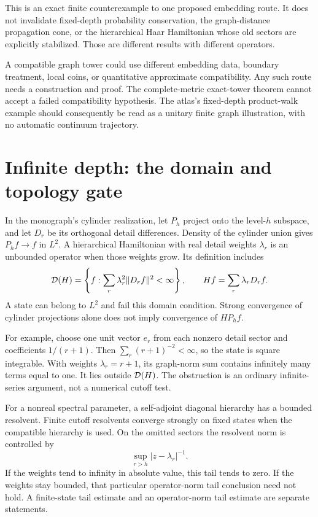 This is an exact finite counterexample to one proposed embedding route. It does not invalidate fixed-depth probability conservation, the graph-distance propagation cone, or the hierarchical Haar Hamiltonian whose old sectors are explicitly stabilized. Those are different results with different operators.

A compatible graph tower could use different embedding data, boundary treatment, local coins, or quantitative approximate compatibility. Any such route needs a construction and proof. The complete-metric exact-tower theorem cannot accept a failed compatibility hypothesis. The atlas's fixed-depth product-walk example should consequently be read as a unitary finite graph illustration, with no automatic continuum trajectory.

\clearpage
\section{Infinite depth: the domain and topology gate}\label{a-verify-infinite}

In the monograph's cylinder realization, let \(P_h\) project onto the level-\(h\) subspace, and let \(D_r\) be its orthogonal detail differences. Density of the cylinder union gives \(P_hf\to f\) in \(L^2\). A hierarchical Hamiltonian with real detail weights \(\lambda_r\) is an unbounded operator when those weights grow. Its definition includes
\[
 \mathcal D(H)=
 \left\{f:\sum_r\lambda_r^2\|D_rf\|^2<\infty\right\},
 \qquad Hf=\sum_r\lambda_rD_rf.
\]
A state can belong to \(L^2\) and fail this domain condition. Strong convergence of cylinder projections alone does not imply convergence of \(HP_hf\).

For example, choose one unit vector \(e_r\) from each nonzero detail sector and coefficients \(1/(r+1)\). Then \(\sum_r(r+1)^{-2}<\infty\), so the state is square integrable. With weights \(\lambda_r=r+1\), its graph-norm sum contains infinitely many terms equal to one. It lies outside \(\mathcal D(H)\). The obstruction is an ordinary infinite-series argument, not a numerical cutoff test.

For a nonreal spectral parameter, a self-adjoint diagonal hierarchy has a bounded resolvent. Finite cutoff resolvents converge strongly on fixed states when the compatible hierarchy is used. On the omitted sectors the resolvent norm is controlled by
\[
 \sup_{r>h}|z-\lambda_r|^{-1}.
\]
If the weights tend to infinity in absolute value, this tail tends to zero. If the weights stay bounded, that particular operator-norm tail conclusion need not hold. A finite-state tail estimate and an operator-norm tail estimate are separate statements.

